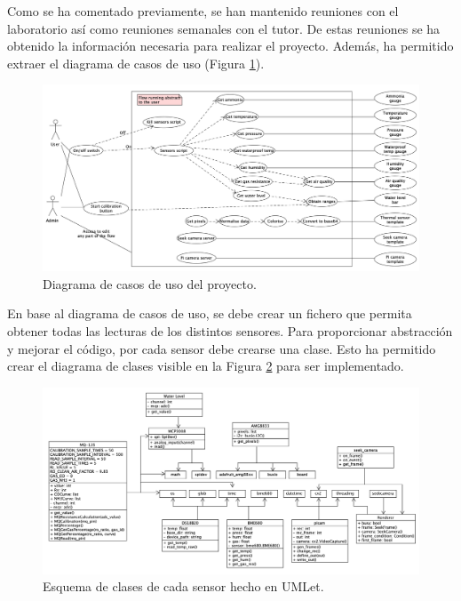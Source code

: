 Como se ha comentado previamente, se han mantenido reuniones con el laboratorio así como reuniones semanales con el tutor. De estas reuniones se ha obtenido la información necesaria para realizar el proyecto. Además, ha permitido extraer el diagrama de casos de uso (Figura \ref{fig:casos}).\\
\begin{figure} [h!]
  \begin{center}
    \includegraphics[width=17cm]{figs/casos}
  \end{center}
  \caption{Diagrama de casos de uso del proyecto.}
  \label{fig:casos}
\end{figure}

En base al diagrama de casos de uso, se debe crear un fichero que permita obtener todas las lecturas de los distintos sensores. Para proporcionar abstracción y mejorar el código, por cada sensor debe crearse una clase. Esto ha permitido crear el diagrama de clases visible en la Figura \ref{fig:umlet} para ser implementado.\\
\begin{figure} [h!]
  \begin{center}
    \includegraphics[width=14cm]{figs/umlet}
  \end{center}
  \caption{Esquema de clases de cada sensor hecho en UMLet.}
  \label{fig:umlet}
\end{figure}

